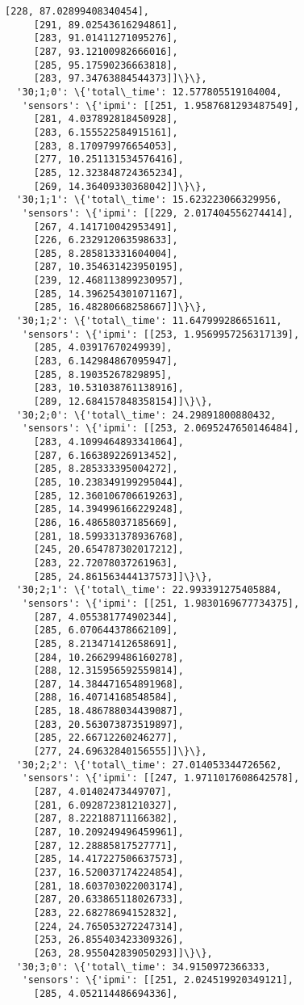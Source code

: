 \documentclass[11pt]{article}
\begin{document}
\begin{tcolorbox}[breakable, size=fbox, boxrule=.5pt, pad at break*=1mm, opacityfill=0]
\begin{Verbatim}[commandchars=\\\{\}]
     [228, 87.02899408340454],
     [291, 89.02543616294861],
     [283, 91.01411271095276],
     [287, 93.12100982666016],
     [285, 95.17590236663818],
     [283, 97.34763884544373]]\}\},
  '30;1;0': \{'total\_time': 12.577805519104004,
   'sensors': \{'ipmi': [[251, 1.9587681293487549],
     [281, 4.037892818450928],
     [283, 6.155522584915161],
     [283, 8.170979976654053],
     [277, 10.251131534576416],
     [285, 12.323848724365234],
     [269, 14.36409330368042]]\}\},
  '30;1;1': \{'total\_time': 15.623223066329956,
   'sensors': \{'ipmi': [[229, 2.017404556274414],
     [267, 4.141710042953491],
     [226, 6.232912063598633],
     [285, 8.285813331604004],
     [287, 10.354631423950195],
     [239, 12.468113899230957],
     [285, 14.396254301071167],
     [285, 16.48280668258667]]\}\},
  '30;1;2': \{'total\_time': 11.647999286651611,
   'sensors': \{'ipmi': [[253, 1.9569957256317139],
     [285, 4.03917670249939],
     [283, 6.142984867095947],
     [285, 8.19035267829895],
     [283, 10.531038761138916],
     [289, 12.684157848358154]]\}\},
  '30;2;0': \{'total\_time': 24.29891800880432,
   'sensors': \{'ipmi': [[253, 2.0695247650146484],
     [283, 4.1099464893341064],
     [287, 6.166389226913452],
     [285, 8.285333395004272],
     [285, 10.238349199295044],
     [285, 12.360106706619263],
     [285, 14.394996166229248],
     [286, 16.48658037185669],
     [281, 18.599331378936768],
     [245, 20.654787302017212],
     [283, 22.72078037261963],
     [285, 24.861563444137573]]\}\},
  '30;2;1': \{'total\_time': 22.993391275405884,
   'sensors': \{'ipmi': [[251, 1.9830169677734375],
     [287, 4.055381774902344],
     [285, 6.070644378662109],
     [285, 8.213471412658691],
     [284, 10.266299486160278],
     [288, 12.315956592559814],
     [287, 14.384471654891968],
     [288, 16.40714168548584],
     [285, 18.486788034439087],
     [283, 20.563073873519897],
     [285, 22.66712260246277],
     [277, 24.69632840156555]]\}\},
  '30;2;2': \{'total\_time': 27.014053344726562,
   'sensors': \{'ipmi': [[247, 1.9711017608642578],
     [287, 4.01402473449707],
     [281, 6.092872381210327],
     [287, 8.222188711166382],
     [287, 10.209249496459961],
     [287, 12.28885817527771],
     [285, 14.417227506637573],
     [237, 16.520037174224854],
     [281, 18.603703022003174],
     [287, 20.633865118026733],
     [283, 22.68278694152832],
     [224, 24.765053272247314],
     [253, 26.855403423309326],
     [263, 28.955042839050293]]\}\},
  '30;3;0': \{'total\_time': 34.9150972366333,
   'sensors': \{'ipmi': [[251, 2.024519920349121],
     [285, 4.052114486694336],

\end{Verbatim}
\end{tcolorbox}
\end{document}
